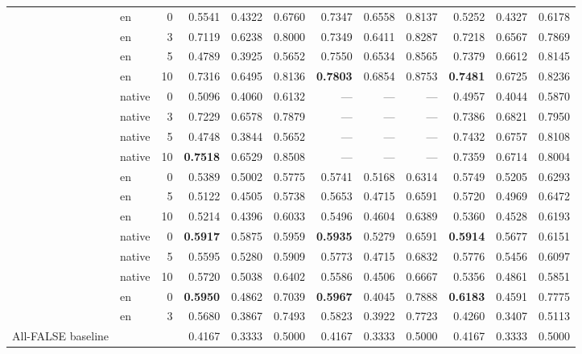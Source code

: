 \documentclass[
]{ceurart}
\theoremstyle{definition}
\begin{document}
\begin{table}[t]
\begin{tabular}{llr rrr rrr rrr}
 & en     &  0 & 0.5541 & 0.4322 & 0.6760 & 0.7347 & 0.6558 & 0.8137 & 0.5252 & 0.4327 & 0.6178 \\
 & en     &  3 & 0.7119 & 0.6238 & 0.8000 & 0.7349 & 0.6411 & 0.8287 & 0.7218 & 0.6567 & 0.7869 \\
 & en     &  5 & 0.4789 & 0.3925 & 0.5652 & 0.7550 & 0.6534 & 0.8565 & 0.7379 & 0.6612 & 0.8145 \\
 & en     & 10 & 0.7316 & 0.6495 & 0.8136 & \textbf{0.7803} & 0.6854 & 0.8753 & \textbf{0.7481} & 0.6725 & 0.8236 \\
 & native &  0 & 0.5096 & 0.4060 & 0.6132 & ---    & ---    & ---    & 0.4957 & 0.4044 & 0.5870 \\
 & native &  3 & 0.7229 & 0.6578 & 0.7879 & ---    & ---    & ---    & 0.7386 & 0.6821 & 0.7950 \\
 & native &  5 & 0.4748 & 0.3844 & 0.5652 & ---    & ---    & ---    & 0.7432 & 0.6757 & 0.8108 \\
 & native & 10 & \textbf{0.7518} & 0.6529 & 0.8508 & ---    & ---    & ---    & 0.7359 & 0.6714 & 0.8004 \\
\midrule
 & en     &  0 & 0.5389 & 0.5002 & 0.5775 & 0.5741 & 0.5168 & 0.6314 & 0.5749 & 0.5205 & 0.6293 \\
 & en     &  5 & 0.5122 & 0.4505 & 0.5738 & 0.5653 & 0.4715 & 0.6591 & 0.5720 & 0.4969 & 0.6472 \\
 & en     & 10 & 0.5214 & 0.4396 & 0.6033 & 0.5496 & 0.4604 & 0.6389 & 0.5360 & 0.4528 & 0.6193 \\
 & native &  0 & \textbf{0.5917} & 0.5875 & 0.5959 & \textbf{0.5935} & 0.5279 & 0.6591 & \textbf{0.5914} & 0.5677 & 0.6151 \\
 & native &  5 & 0.5595 & 0.5280 & 0.5909 & 0.5773 & 0.4715 & 0.6832 & 0.5776 & 0.5456 & 0.6097 \\
 & native & 10 & 0.5720 & 0.5038 & 0.6402 & 0.5586 & 0.4506 & 0.6667 & 0.5356 & 0.4861 & 0.5851 \\
\midrule
 & en     &  0 & \textbf{0.5950} & 0.4862 & 0.7039 & \textbf{0.5967} & 0.4045 & 0.7888 & \textbf{0.6183} & 0.4591 & 0.7775 \\
 & en     &  3 & 0.5680 & 0.3867 & 0.7493 & 0.5823 & 0.3922 & 0.7723 & 0.4260 & 0.3407 & 0.5113 \\
\midrule
All-FALSE baseline & & & 0.4167 & 0.3333 & 0.5000 & 0.4167 & 0.3333 & 0.5000 & 0.4167 & 0.3333 & 0.5000 \\
\bottomrule
\end{tabular}
\end{table}
\end{document}
